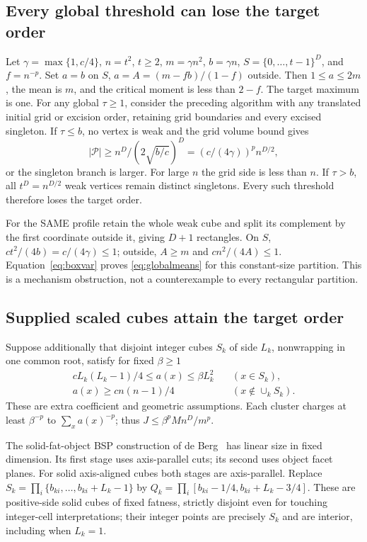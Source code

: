 \subsection{Every global threshold can lose the target order}
Let $\gamma=\max\{1,c/4\}$, $n=t^2$, $t\geq2$, $m=\gamma n^2$,
$b=\gamma n$, $S=\{0,\ldots,t-1\}^D$, and $f=n^{-p}$. Set $a=b$ on
$S$, $a=A=(m-fb)/(1-f)$ outside. Then $1\leq a\leq2m$, the mean is
$m$, and the critical moment is less than $2-f$. The target maximum is one.
For any global $\tau\geq1$, consider the preceding algorithm with any
translated initial grid or excision order, retaining grid boundaries and
every excised singleton. If $\tau\leq b$, no vertex is weak and the grid
volume bound gives
\[
 |\mathcal P|\geq n^D/(2\sqrt{b/c})^D
     =(c/(4\gamma))^p n^{D/2},
\]
or the singleton branch is larger. For large $n$ the grid side is less
than $n$. If $\tau>b$, all $t^D=n^{D/2}$ weak vertices remain distinct
singletons. Every such threshold therefore loses the target order.

For the SAME profile retain the whole weak cube and split its complement
by the first coordinate outside it, giving $D+1$ rectangles. On $S$,
$ct^2/(4b)=c/(4\gamma)\leq1$; outside, $A\geq m$ and
$cn^2/(4A)\leq1$. Equation~\eqref{eq:boxvar} proves
\eqref{eq:globalmeans} for this constant-size partition. This is a
mechanism obstruction, not a counterexample to every rectangular partition.

\subsection{Supplied scaled cubes attain the target order}
Suppose additionally that disjoint integer cubes $S_k$ of side $L_k$,
nonwrapping in one common root, satisfy for fixed $\beta\geq1$
\begin{equation}\label{eq:scaled-assumptions}
 \begin{split}
 cL_k(L_k-1)/4\leq a(x)\leq\beta L_k^2 &\quad(x\in S_k),\\
 a(x)\geq cn(n-1)/4 &\quad(x\notin\cup_k S_k).
 \end{split}
\end{equation}
These are extra coefficient and geometric assumptions. Each cluster charges
at least $\beta^{-p}$ to $\sum_xa(x)^{-p}$; thus
$J\leq\beta^p M n^D/m^p$.

The solid-fat-object BSP construction of de Berg~\cite{deberg} has linear
size in fixed dimension. Its first stage uses axis-parallel cuts; its second
uses object facet planes. For solid axis-aligned cubes both stages are
axis-parallel. Replace $S_k=\prod_i\{b_{ki},\ldots,b_{ki}+L_k-1\}$ by
$Q_k=\prod_i[b_{ki}-1/4,b_{ki}+L_k-3/4]$. These are positive-side solid
cubes of fixed fatness, strictly disjoint even for touching integer-cell
interpretations; their integer points are precisely $S_k$ and are interior,
including when $L_k=1$.

